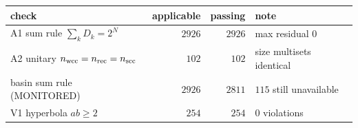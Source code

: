 \begin{tabular}{lrrl}
\hline
check & applicable & passing & note \\
\hline
A1 sum rule $\sum_k D_k = 2^N$ & $2926$ & $2926$ & max residual $0$ \\
A2 unitary $n_{\rm wcc}=n_{\rm rec}=n_{\rm scc}$ & $102$ & $102$ & size multisets identical \\
basin sum rule (MONITORED) & $2926$ & $2811$ & $115$ still unavailable \\
V1 hyperbola $ab\geq2$ & $254$ & $254$ & $0$ violations \\
\hline
\end{tabular}
